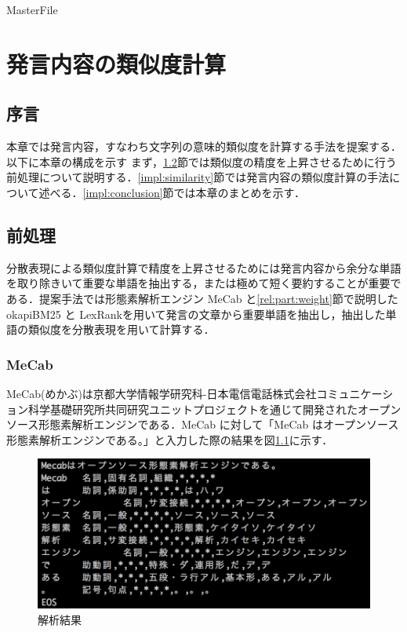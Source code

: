\expandafter\ifx\csname MasterFile\endcsname\relax
	\def\SubFile{hoge}
	
	
	\setcounter{chapter}{3}
  \fi
  \cleardoublepage
\chapter{発言内容の類似度計算}

\label{impl:chapter}

\section{序言}
\label{impl:introduction}
本章では発言内容，すなわち文字列の意味的類似度を計算する手法を提案する．以下に本章の構成を示す
まず，\ref{impl:preProcessing}節では類似度の精度を上昇させるために行う前処理について説明する．\ref{impl:similarity}節では発言内容の類似度計算の手法について述べる．\ref{impl:conclusion}節では本章のまとめを示す．

\section{前処理}
\label{impl:preProcessing}
分散表現による類似度計算で精度を上昇させるためには発言内容から余分な単語を取り除きいて重要な単語を抽出する，または極めて短く要約することが重要である．提案手法では形態素解析エンジン MeCab と\ref{rel:part:weight}節で説明したokapiBM25 と LexRankを用いて発言の文章から重要単語を抽出し，抽出した単語の類似度を分散表現を用いて計算する．
\subsection{MeCab}
MeCab(めかぶ)\cite{kudo2005mecab}は京都大学情報学研究科-日本電信電話株式会社コミュニケーション科学基礎研究所共同研究ユニットプロジェクトを通じて開発されたオープンソース形態素解析エンジンである．MeCab に対して「MeCab はオープンソース形態素解析エンジンである。」と入力した際の結果を図\ref{Fig:mecab}に示す．
\begin{figure}[htbp]
 \begin{center}
  \includegraphics[width=\textwidth]{../images/4.Implementation/mecab.png}
  \caption{解析結果}
  \label{Fig:mecab}
  \vspace{-10pt}
 \end{center}
\end{figure}

